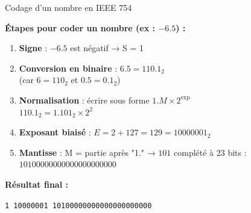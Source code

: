 \documentclass[aspectratio=1610]{beamer}
\begin{document}
\begin{frame}{Codage d'un nombre en IEEE 754}

  \textbf{Étapes pour coder un nombre (ex : $-6.5$) :}

  \vspace{0.3cm}

  \begin{enumerate}
    \item \textbf{Signe} : $-6.5$ est négatif → S = 1

    \pause

    \item \textbf{Conversion en binaire} : $6.5 = 110.1_2$ \\
          (car $6 = 110_2$ et $0.5 = 0.1_2$)

    \pause

    \item \textbf{Normalisation} : écrire sous forme $1.M \times 2^{\text{exp}}$ \\
          $110.1_2 = 1.101_2 \times 2^2$

    \pause

    \item \textbf{Exposant biaisé} : $E = 2 + 127 = 129 = 10000001_2$

    \pause

    \item \textbf{Mantisse} : M = partie après "1." → $101$ complété à 23 bits : \\
          $10100000000000000000000$
  \end{enumerate}

  \vspace{0.3cm}

  \textbf{Résultat final :}

  \begin{center}
    \texttt{1 10000001 10100000000000000000000}
  \end{center}

\end{frame}
\end{document}
